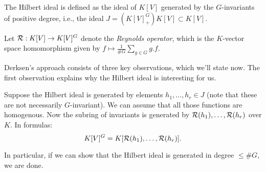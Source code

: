 \documentclass[../main.tex]{subfiles}
\begin{document}
\begin{defi}
    The Hilbert ideal is defined as the ideal of $K[V]$ generated by the 
    $G$-invariants of positive degree, i.e., the ideal $J = (K[V]^G_+) K[V] 
    \subset K[V]$. 
\end{defi}
Let $\mathcal{R}: K[V] \to K[V]^G$ denote the \emph{Reynolds operator}, which is the $K$-vector
space homomorphism given by $f \mapsto \allowbreak \frac{1}{\# G} \allowbreak
\sum_{g \in G} g.f$. 

Derksen's approach consists of three key observations, which we'll state now.
The first observation explains why the Hilbert ideal is interesting for us.
\begin{prop}\label{prop:obs1}
    Suppose the Hilbert ideal is generated by elements $h_1, \dots, h_r \in J$ 
    (note that these are not necessarily $G$-invariant).
    We can assume that all those functions are homogenous. Now the subring of invariants
    is generated by $\mathcal{R}(h_1), \dots, \mathcal{R}(h_r)$ over $K$. In formulas:
    \begin{equation*}
        K[V]^G = K[\mathcal{R}(h_1), \dots, \mathcal{R}(h_r)].
    \end{equation*}
\end{prop}
In particular, if we can show that the Hilbert ideal is generated in degree $\leq \#G$,
we are done.
\end{document}
